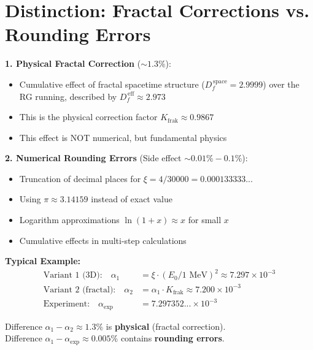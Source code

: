 	\section{Distinction: Fractal Corrections vs. Rounding Errors}
	
	\begin{tcolorbox}[colback=green!5!white,colframe=green!75!black,title={Two Types of Corrections in T0 Calculations}]
		\textbf{1. Physical Fractal Correction} ($\sim 1.3\%$):
		\begin{itemize}
			\item Cumulative effect of fractal spacetime structure ($D_f^{\,\text{space}} = 2.9999$) over the RG running, described by $D_f^{\,\text{eff}} \approx 2.973$
			\item This is the physical correction factor $K_{\text{frak}} \approx 0.9867$
			\item This effect is NOT numerical, but fundamental physics
		\end{itemize}
		
		\textbf{2. Numerical Rounding Errors} (Side effect $\sim 0.01\% - 0.1\%$):
		\begin{itemize}
			\item Truncation of decimal places for $\xi = 4/30000 = 0.000133333...$
			\item Using $\pi \approx 3.14159$ instead of exact value
			\item Logarithm approximations $\ln(1+x) \approx x$ for small $x$
			\item Cumulative effects in multi-step calculations
		\end{itemize}
		
		\textbf{Typical Example:}
		\begin{align}
			\text{Variant 1 (3D):} \quad \alpha_1 &= \xi \cdot (E_0/1\text{ MeV})^2 \approx 7.297 \times 10^{-3} \\
			\text{Variant 2 (fractal):} \quad \alpha_2 &= \alpha_1 \cdot K_{\text{frak}} \approx 7.200 \times 10^{-3} \\
			\text{Experiment:} \quad \alpha_{\text{exp}} &= 7.297352... \times 10^{-3}
		\end{align}
		
		Difference $\alpha_1 - \alpha_2 \approx 1.3\%$ is \textbf{physical} (fractal correction).\\
		Difference $\alpha_1 - \alpha_{\text{exp}} \approx 0.005\%$ contains \textbf{rounding errors}.
	\end{tcolorbox}
	
